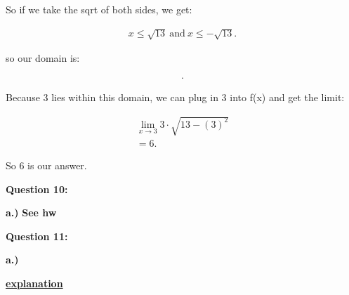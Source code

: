 \documentclass{report}
\begin{document}
    \bigbreak \noindent 
    So if we take the sqrt of both sides, we get:

    \begin{align*}
        x \leq \sqrt{13}\ \text{and}\ x \leq - \sqrt{13}
    .\end{align*}

    \bigbreak \noindent 
    so our domain is:

    \begin{align*}
        [- \sqrt{13}, \sqrt{13}]
    .\end{align*}

    \bigbreak \noindent 
    Because 3 lies within this domain, we can plug in 3 into f(x) and get the limit:

    \begin{align*}
        \lim\limits_{x \to 3}{3 \cdot \sqrt{13- \left(3\right)^2}} \\
        = 6
    .\end{align*}

    \bigbreak \noindent 
    So 6 is our answer.

    \bigbreak \noindent \bigbreak \noindent \bigbreak \noindent  
    \begin{Large}
        \textbf{Question 10:}
    \end{Large}

    \bigbreak \noindent 
    \textbf{a.)}
    \bigbreak \noindent
    \textbf{See hw}

    \bigbreak \noindent \bigbreak \noindent \bigbreak \noindent  
    \begin{Large}
        \textbf{Question 11:}
    \end{Large}

    \bigbreak \noindent 
    \textbf{a.)}
    \bigbreak \noindent
    \begin{center}
        \begin{Huge}
            \textbf{\href{https://www.wyzant.com/resources/answers/174393/find_the_values_of_a_and_b_that_make_f_continuous_everywhere}{explanation}}
        \end{Huge}
    \end{center}
    
    
\end{document}
